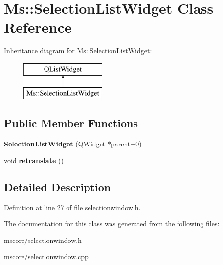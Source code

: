 \hypertarget{class_ms_1_1_selection_list_widget}{}\section{Ms\+:\+:Selection\+List\+Widget Class Reference}
\label{class_ms_1_1_selection_list_widget}
Inheritance diagram for Ms\+:\+:Selection\+List\+Widget\+:\begin{figure}[H]
\begin{center}
\leavevmode
\includegraphics[height=2.000000cm]{class_ms_1_1_selection_list_widget}
\end{center}
\end{figure}
\subsection*{Public Member Functions}
\begin{DoxyCompactItemize}
\item 
\mbox{\label{class_ms_1_1_selection_list_widget_ae2ac6ed5b461df3d228d816d630218cf}} 
{\bfseries Selection\+List\+Widget} (Q\+Widget $\ast$parent=0)
\item 
\mbox{\label{class_ms_1_1_selection_list_widget_a1cbab5807ea815e984ebdacd8691ecd9}} 
void {\bfseries retranslate} ()
\end{DoxyCompactItemize}


\subsection{Detailed Description}


Definition at line 27 of file selectionwindow.\+h.



The documentation for this class was generated from the following files\+:\begin{DoxyCompactItemize}
\item 
mscore/selectionwindow.\+h\item 
mscore/selectionwindow.\+cpp\end{DoxyCompactItemize}

